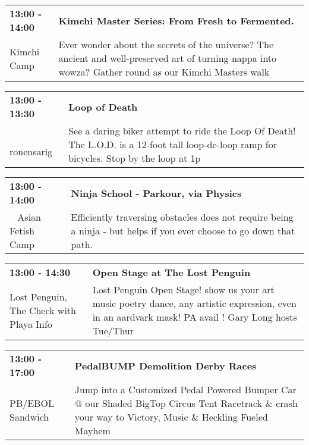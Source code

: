 \begin{tabular}{ p{1in} p{2.2in} }
    \textbf{13:00 - 14:00} & \textbf{Kimchi Master Series: From Fresh to Fermented.} \\
    Kimchi Camp \newline  & Ever wonder about the secrets of the universe? The ancient and well-preserved art of turning nappa into wowza? Gather round as our Kimchi Masters walk \\
    \hline 
\end{tabular}
    
\begin{tabular}{ p{1in} p{2.2in} }
    \textbf{13:00 - 13:30} & \textbf{Loop of Death} \\
    ~ \newline ronensarig & See a daring biker attempt to ride the Loop Of Death! The L.O.D. is a 12-foot tall loop-de-loop ramp for bicycles. Stop by the loop at 1p \\
    \hline 
\end{tabular}
    
\begin{tabular}{ p{1in} p{2.2in} }
    \textbf{13:00 - 14:00} & \textbf{Ninja School - Parkour, via Physics} \\
    ~ \newline Asian Fetish Camp & Efficiently traversing obstacles does not require being a ninja - but helps if you ever choose to go down that path. \\
    \hline 
\end{tabular}
    
\begin{tabular}{ p{1in} p{2.2in} }
    \textbf{13:00 - 14:30} & \textbf{Open Stage at The Lost Penguin} \\
    Lost Penguin, The \newline  Check with Playa Info & Lost Penguin Open Stage! show us your art music poetry dance, any artistic expression, even in an aardvark mask! PA avail !  Gary Long hosts Tue/Thur \\
    \hline 
\end{tabular}
    
\begin{tabular}{ p{1in} p{2.2in} }
    \textbf{13:00 - 17:00} & \textbf{PedalBUMP Demolition Derby Races} \\
    PB/EBOL Sandwich \newline  & Jump into a Customized Pedal Powered Bumper Car @ our Shaded BigTop Circus Tent Racetrack \& crash your way to Victory, Music \& Heckling Fueled Mayhem \\
    \hline 
\end{tabular}
    
